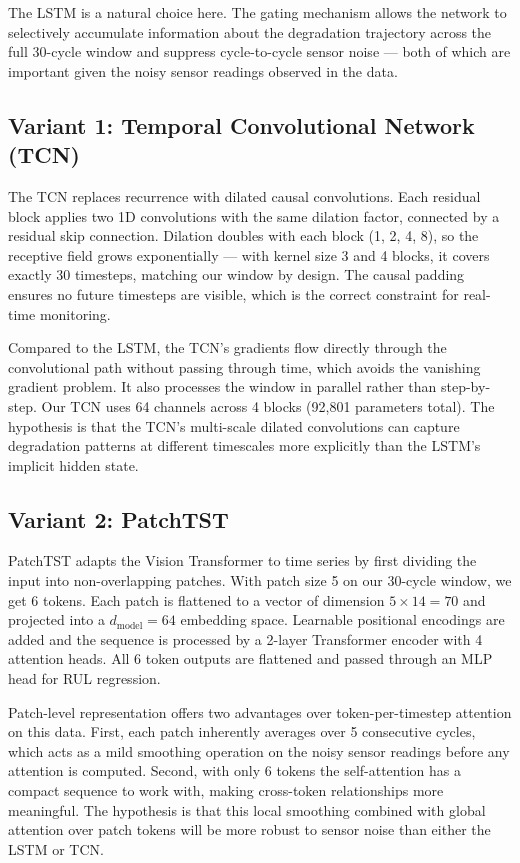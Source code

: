 \documentclass{article}
\begin{document}
The LSTM is a natural choice here. The gating mechanism allows the network to selectively accumulate information about the degradation trajectory across the full 30-cycle window and suppress cycle-to-cycle sensor noise — both of which are important given the noisy sensor readings observed in the data.

\subsection*{Variant 1: Temporal Convolutional Network (TCN)}

The TCN \citep{bai2018empirical} replaces recurrence with dilated causal convolutions. Each residual block applies two 1D convolutions with the same dilation factor, connected by a residual skip connection. Dilation doubles with each block (1, 2, 4, 8), so the receptive field grows exponentially — with kernel size 3 and 4 blocks, it covers exactly 30 timesteps, matching our window by design. The causal padding ensures no future timesteps are visible, which is the correct constraint for real-time monitoring.

Compared to the LSTM, the TCN's gradients flow directly through the convolutional path without passing through time, which avoids the vanishing gradient problem. It also processes the window in parallel rather than step-by-step. Our TCN uses 64 channels across 4 blocks (92,801 parameters total). The hypothesis is that the TCN's multi-scale dilated convolutions can capture degradation patterns at different timescales more explicitly than the LSTM's implicit hidden state.

\subsection*{Variant 2: PatchTST}

PatchTST \citep{nie2023time} adapts the Vision Transformer to time series by first dividing the input into non-overlapping patches. With patch size 5 on our 30-cycle window, we get 6 tokens. Each patch is flattened to a vector of dimension $5 \times 14 = 70$ and projected into a $d_\text{model} = 64$ embedding space. Learnable positional encodings are added and the sequence is processed by a 2-layer Transformer encoder with 4 attention heads. All 6 token outputs are flattened and passed through an MLP head for RUL regression.

Patch-level representation offers two advantages over token-per-timestep attention on this data. First, each patch inherently averages over 5 consecutive cycles, which acts as a mild smoothing operation on the noisy sensor readings before any attention is computed. Second, with only 6 tokens the self-attention has a compact sequence to work with, making cross-token relationships more meaningful. The hypothesis is that this local smoothing combined with global attention over patch tokens will be more robust to sensor noise than either the LSTM or TCN.
\end{document}
